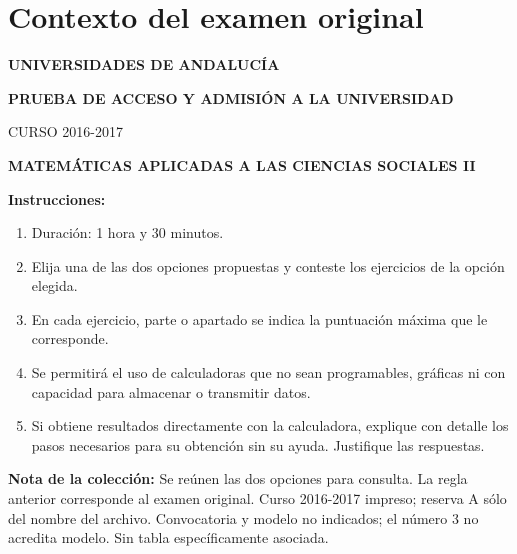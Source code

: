 \section*{Contexto del examen original}
\textbf{UNIVERSIDADES DE ANDALUCÍA}\par
\textbf{PRUEBA DE ACCESO Y ADMISIÓN A LA UNIVERSIDAD}\par
CURSO 2016-2017\par
\textbf{MATEMÁTICAS APLICADAS A LAS CIENCIAS SOCIALES II}

\textbf{Instrucciones:}
\begin{enumerate}[label=\textbf{\alph*)}]
  \item Duración: 1 hora y 30 minutos.
  \item Elija una de las dos opciones propuestas y conteste los ejercicios de la opción elegida.
  \item En cada ejercicio, parte o apartado se indica la puntuación máxima que le corresponde.
  \item Se permitirá el uso de calculadoras que no sean programables, gráficas ni con capacidad para almacenar o transmitir datos.
  \item Si obtiene resultados directamente con la calculadora, explique con detalle los pasos necesarios para su obtención sin su ayuda. Justifique las respuestas.
\end{enumerate}
\noindent\textbf{Nota de la colección:} Se reúnen las dos opciones para consulta.
La regla anterior corresponde al examen original. Curso 2016-2017 impreso; reserva A sólo del nombre del archivo. Convocatoria y modelo no indicados; el número 3 no acredita modelo. Sin tabla específicamente asociada.
\par\medskip
